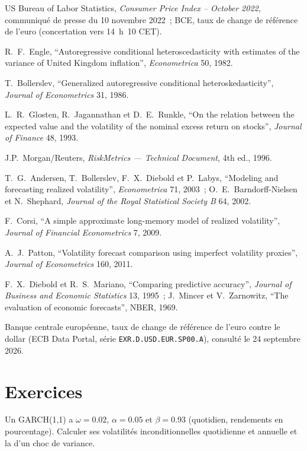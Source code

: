\begin{omsources}
\item US Bureau of Labor Statistics, \emph{Consumer Price Index -- October 2022}, communiqué de presse du 10 novembre 2022~; BCE, taux de change de référence de l'euro (concertation vers 14~h~10 CET).
\item R.~F.~Engle, ``Autoregressive conditional heteroscedasticity with estimates of the variance of United Kingdom inflation'', \emph{Econometrica} 50, 1982.
\item T.~Bollerslev, ``Generalized autoregressive conditional heteroskedasticity'', \emph{Journal of Econometrics} 31, 1986.
\item L.~R.~Glosten, R.~Jagannathan et D.~E.~Runkle, ``On the relation between the expected value and the volatility of the nominal excess return on stocks'',
\emph{Journal of Finance} 48, 1993.
\item J.P.~Morgan/Reuters, \emph{RiskMetrics --- Technical Document}, 4th ed., 1996.
\item T.~G.~Andersen, T.~Bollerslev, F.~X.~Diebold et P.~Labys, ``Modeling and forecasting realized volatility'', \emph{Econometrica} 71, 2003~;
O.~E.~Barndorff-Nielsen et N.~Shephard, \emph{Journal of the Royal Statistical Society B} 64, 2002.
\item F.~Corsi, ``A simple approximate long-memory model of realized volatility'', \emph{Journal of Financial Econometrics} 7, 2009.
\item A.~J.~Patton, ``Volatility forecast comparison using imperfect volatility proxies'', \emph{Journal of Econometrics} 160, 2011.
\item F.~X.~Diebold et R.~S.~Mariano, ``Comparing predictive accuracy'', \emph{Journal of Business and Economic Statistics} 13, 1995~; J.~Mincer et
V.~Zarnowitz, ``The evaluation of economic forecasts'', NBER, 1969.
\item Banque centrale européenne, taux de change de référence de l'euro contre le dollar (ECB Data Portal, série \texttt{EXR.D.USD.EUR.SP00.A}), consulté le 24
septembre 2026.
\end{omsources}

\section{Exercices}

\begin{exercise}[$\star$]\label{exo:qm:volatility-models:1}
Un GARCH(1,1) a $\omega = 0.02$, $\alpha = 0.05$ et $\beta = 0.93$ (quotidien, rendements en pourcentage). Calculer ses volatilités inconditionnelles quotidienne et annuelle et
la  d'un choc de variance.
\end{exercise}

